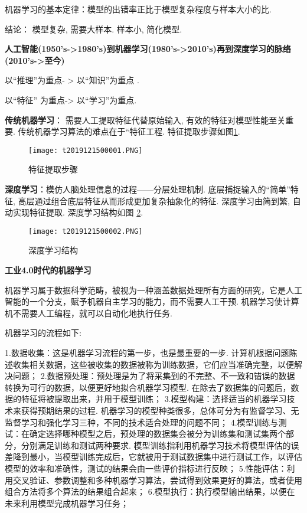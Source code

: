 机器学习的基本定律：模型的出错率正比于模型复杂程度与样本大小的比.

结论： 模型复杂, 需要大样本. 样本小, 简化模型.

\textbf{人工智能(1950's->1980's)到机器学习(1980's->2010's)再到深度学习的脉络(2010's->至今)}
\begin{center}
以“推理”为重点- > 以“知识”为重点 .

以“特征” 为重点-> 以“学习”为重点.
\end{center}

\textbf{传统机器学习}： 需要人工提取特征代替原始输入, 有效的特征对模型性能至关重要. 传统机器学习算法的难点在于“特征工程. 特征提取步骤如图\ref{AI32fig2019121501}.
\begin{figure}[H]
\centering
\texttt{[image: t2019121500001.PNG]}
\caption{特征提取步骤}
\label{AI32fig2019121501}
\end{figure}

\textbf{深度学习}：模仿人脑处理信息的过程——分层处理机制. 底层捕捉输入的“简单”特征, 高层通过组合底层特征从而形成更加复杂抽象化的特征. 深度学习由简到繁, 自动实现特征提取. 深度学习结构如图 \ref{AI32fig2019121502}.
\begin{figure}[H]
\centering
\texttt{[image: t2019121500002.PNG]}
\caption{深度学习结构}
\label{AI32fig2019121502}
\end{figure}
\textbf{工业4.0时代的机器学习}

机器学习属于数据科学范畴，被视为一种涵盖数据处理所有方面的研究，它是人工智能的一个分支，赋予机器自主学习的能力，而不需要人工干预. 机器学习使计算机不需要人工编程，就可以自动化地执行任务.

机器学习的流程如下:

1.数据收集：这是机器学习流程的第一步，也是最重要的一步. 计算机根据问题陈述收集相关数据，这些被收集的数据被称为训练数据，它们应当准确完整，以便解决问题；
2.数据预处理：预处理是为了将采集到的不完整、不一致和错误的数据转换为可行的数据，以便更好地拟合机器学习模型. 在除去了数据集的问题后，数据的特征将被提取出来，并用于模型训练；
3.模型构建：选择适当的机器学习技术来获得预期结果的过程. 机器学习的模型种类很多，总体可分为有监督学习、无监督学习和强化学习三种，不同的技术适合处理的问题不同；
4.模型训练与测试：在确定选择哪种模型之后，预处理的数据集会被分为训练集和测试集两个部分，分别满足训练和测试两种要求. 模型训练指利用机器学习技术将模型评估的误差降到最小，当模型训练完成后，它就被用于测试数据集中进行测试工作，以评估模型的效率和准确性，测试的结果会由一些评价指标进行反映；
5.性能评估：利用交叉验证、参数调整和多种机器学习算法，尝试得到效果更好的算法，或者使用组合方法将多个算法的结果组合起来；
6.模型执行：执行模型输出结果，以便在未来利用模型完成机器学习任务；


